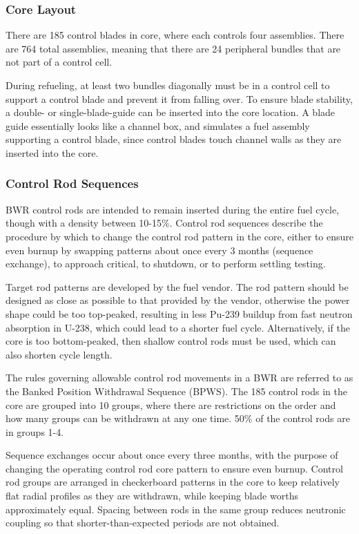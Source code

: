 \documentclass[10pt]{article}
\newcounter{subsubsubsection}[subsubsection]
\begin{document}
\subsubsection{Core Layout}
There are 185 control blades in  core, where each controls four assemblies. There are 764 total assemblies, meaning that there are 24 peripheral bundles that are not part of a control cell.

During refueling, at least two bundles diagonally must be in a control cell to support a control blade and prevent it from falling over. To ensure blade stability, a double- or single-blade-guide can be inserted into the core location. A blade guide essentially looks like a channel box, and simulates a fuel assembly supporting a control blade, since control blades touch channel walls as they are inserted into the core.

\subsubsection{Control Rod Sequences}
BWR control rods are intended to remain inserted during the entire fuel cycle, though with a density between 10-15\%. Control rod sequences describe the procedure by which to change the control rod pattern in the core, either to ensure even burnup by swapping patterns about once every 3 months (sequence exchange), to approach critical, to shutdown, or to perform settling testing. 

Target rod patterns are developed by the fuel vendor. The rod pattern should be designed as close as possible to that provided by the vendor, otherwise the power shape could be too top-peaked, resulting in less Pu-239 buildup from fast neutron absorption in U-238, which could lead to a shorter fuel cycle. Alternatively, if the core is too bottom-peaked, then shallow control rods must be used, which can also shorten cycle length. 

The rules governing allowable control rod movements in a BWR are referred to as the Banked Position Withdrawal Sequence (BPWS). The 185 control rods in the  core are grouped into 10 groups, where there are restrictions on the order and how many groups can be withdrawn at any one time. 50\% of the control rods are in groups 1-4. 

Sequence exchanges occur about once every three months, with the purpose of changing the operating control rod core pattern to ensure even burnup. Control rod groups are arranged in checkerboard patterns in the core to keep relatively flat radial profiles as they are withdrawn, while keeping blade worths approximately equal. Spacing between rods in the same group reduces neutronic coupling so that shorter-than-expected periods are not obtained. 
\end{document}
